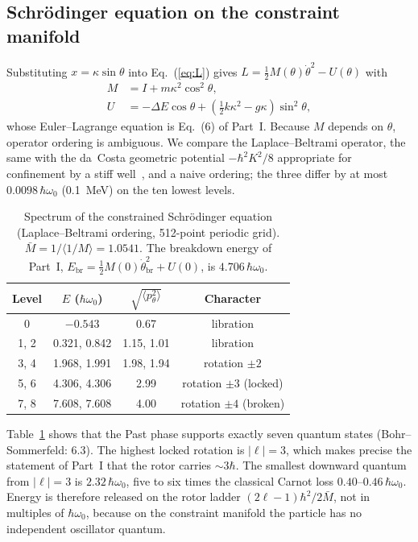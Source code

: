 \documentclass[aps,prc,twocolumn,superscriptaddress,amsmath,amssymb,nofootinbib]{revtex4-2}
\begin{document}
\subsection{Schr\"odinger equation on the constraint manifold}
Substituting $x=\kappa\sin\theta$ into Eq.~(\ref{eq:L}) gives $L=\frac12M(\theta)\dot\theta^2-U(\theta)$ with
\begin{align}
M&=I+m\kappa^2\cos^2\theta,\\
U&=-\Delta E\cos\theta+\left(\tfrac12k\kappa^2-g\kappa\right)\sin^2\theta,
\end{align}
whose Euler--Lagrange equation is Eq.~(6) of Part~I. Because $M$ depends on $\theta$, operator ordering is ambiguous. We compare the Laplace--Beltrami operator, the same with the da~Costa geometric potential $-\hbar^2K^2/8$ appropriate for confinement by a stiff well~\cite{daCosta1981}, and a naive ordering; the three differ by at most $0.0098\,\hbar\omega_0$ (0.1~MeV) on the ten lowest levels.

\begin{table}[t]
\caption{Spectrum of the constrained Schr\"odinger equation (Laplace--Beltrami ordering, 512-point periodic grid). $\bar M=1/\langle1/M\rangle=1.0541$. The breakdown energy of Part~I, $E_{\text{br}}=\frac12M(0)\dot\theta_{\text{br}}^2+U(0)$, is $4.706\,\hbar\omega_0$.}
\label{tab:levels}
\begin{ruledtabular}
\begin{tabular}{cccc}
Level & $E$ ($\hbar\omega_0$) & $\sqrt{\langle p_\theta^2\rangle}$ & Character \\
\hline
0 & $-0.543$ & 0.67 & libration \\
1, 2 & 0.321, 0.842 & 1.15, 1.01 & libration \\
3, 4 & 1.968, 1.991 & 1.98, 1.94 & rotation $\pm2$ \\
5, 6 & 4.306, 4.306 & 2.99 & rotation $\pm3$ (locked) \\
7, 8 & 7.608, 7.608 & 4.00 & rotation $\pm4$ (broken) \\
\end{tabular}
\end{ruledtabular}
\end{table}

Table~\ref{tab:levels} shows that the Past phase supports exactly seven quantum states (Bohr--Sommerfeld: 6.3). The highest locked rotation is $|\ell|=3$, which makes precise the statement of Part~I that the rotor carries $\sim3\hbar$. The smallest downward quantum from $|\ell|=3$ is $2.32\,\hbar\omega_0$, five to six times the classical Carnot loss $0.40$--$0.46\,\hbar\omega_0$. Energy is therefore released on the rotor ladder $(2\ell-1)\hbar^2/2\bar M$, not in multiples of $\hbar\omega_0$, because on the constraint manifold the particle has no independent oscillator quantum.
\end{document}
